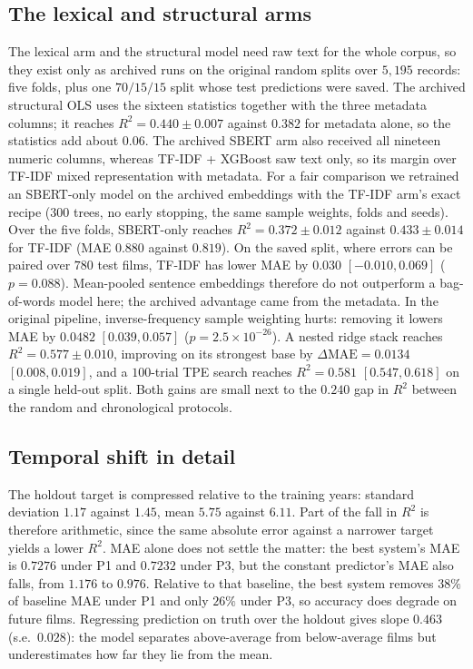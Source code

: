 \documentclass[conference,a4paper]{IEEEtran}
\begin{document}
\subsection{The lexical and structural arms}
\label{sec:lexical}

The lexical arm and the structural model need raw text for the whole
corpus, so they exist only as archived runs on the original random
splits over $5{,}195$ records: five folds, plus one $70/15/15$ split
whose test predictions were saved. The archived structural OLS uses the
sixteen statistics together with the three metadata columns; it reaches
$R^{2} = 0.440 \pm 0.007$ against $0.382$ for metadata alone, so the
statistics add about $0.06$. The archived SBERT arm also received all
nineteen numeric columns, whereas TF-IDF + XGBoost saw text only, so its
margin over TF-IDF mixed representation with metadata. For a fair
comparison we retrained an SBERT-only model on
the archived embeddings with the TF-IDF arm's exact recipe ($300$ trees,
no early stopping, the same sample weights, folds and seeds). Over the
five folds, SBERT-only reaches $R^{2} = 0.372 \pm 0.012$ against
$0.433 \pm 0.014$ for TF-IDF (MAE $0.880$ against $0.819$). On the saved
split, where errors can be paired over $780$ test films, TF-IDF has
lower MAE by $0.030$ $[-0.010, 0.069]$ ($p = 0.088$). Mean-pooled
sentence embeddings therefore do not outperform a bag-of-words model
here; the archived advantage came from the metadata. In the original
pipeline, inverse-frequency sample weighting hurts: removing it lowers
MAE by $0.0482$ $[0.039, 0.057]$
($p = 2.5\times10^{-26}$). A nested ridge stack reaches
$R^{2} = 0.577 \pm 0.010$, improving on its strongest base by
$\Delta\mathrm{MAE} = 0.0134$ $[0.008, 0.019]$, and a $100$-trial TPE
search reaches $R^{2} = 0.581$ $[0.547, 0.618]$ on a single held-out
split. Both gains are small next to the $0.240$ gap in $R^{2}$ between
the random and chronological protocols.

\subsection{Temporal shift in detail}

The holdout target is compressed relative to the training years:
standard deviation $1.17$ against $1.45$, mean $5.75$ against $6.11$.
Part of the fall in $R^{2}$ is therefore arithmetic, since the same
absolute error against a narrower target yields a lower $R^{2}$. MAE
alone does not settle the matter: the best system's MAE is $0.7276$
under P1 and $0.7232$ under P3, but the constant predictor's MAE also
falls, from $1.176$ to $0.976$. Relative to that baseline, the best
system removes $38\%$ of baseline MAE under P1 and only $26\%$ under P3,
so accuracy does degrade on future films. Regressing prediction on truth
over the holdout gives slope $0.463$ (s.e.\ $0.028$): the model separates
above-average from below-average films but underestimates how far they
lie from the mean.
\end{document}
